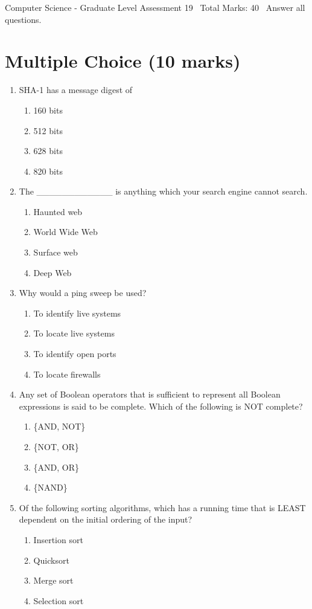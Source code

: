 \documentclass[12pt]{article}
\begin{document}
\begin{center}
Computer Science - Graduate Level Assessment 19 \
Total Marks: 40 \
Answer all questions.
\end{center}

\section*{Multiple Choice (10 marks)}
\begin{enumerate}[label=\arabic*.]
\item SHA-1 has a message digest of
\begin{enumerate}[label=(\alph*)]
    \item 160 bits
    \item 512 bits
    \item 628 bits
    \item 820 bits
\end{enumerate}
\item The \_\_\_\_\_\_\_\_\_\_\_\_ is anything which your search engine cannot search.
\begin{enumerate}[label=(\alph*)]
    \item Haunted web
    \item World Wide Web
    \item Surface web
    \item Deep Web
\end{enumerate}
\item Why would a ping sweep be used?
\begin{enumerate}[label=(\alph*)]
    \item To identify live systems
    \item To locate live systems
    \item To identify open ports
    \item To locate firewalls
\end{enumerate}
\item Any set of Boolean operators that is sufficient to represent all Boolean expressions is said to be complete. Which of the following is NOT complete?
\begin{enumerate}[label=(\alph*)]
    \item \{AND, NOT\}
    \item \{NOT, OR\}
    \item \{AND, OR\}
    \item \{NAND\}
\end{enumerate}
\item Of the following sorting algorithms, which has a running time that is LEAST dependent on the initial ordering of the input?
\begin{enumerate}[label=(\alph*)]
    \item Insertion sort
    \item Quicksort
    \item Merge sort
    \item Selection sort
\end{enumerate}
\end{enumerate}
\end{document}
